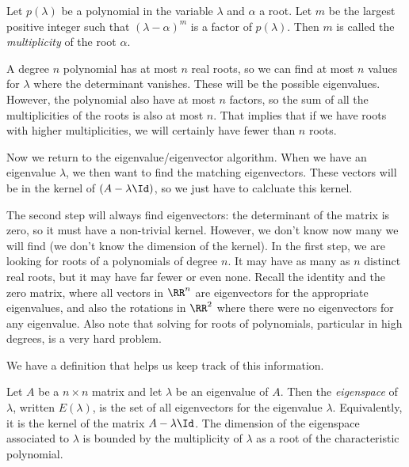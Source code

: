 \documentclass[fleqn]{report}
\begin{document}
\begin{defn}
Let $p(\lambda)$ be a polynomial in the variable $\lambda$ and
$\alpha$ a root. Let $m$ be the largest positive integer such
that $(\lambda - \alpha)^m$ is a factor of $p(\lambda)$. Then
$m$ is called the \emph{multiplicity} of the root $\alpha$. 
\end{defn}

A degree $n$ polynomial has at most $n$ real roots, so we can
find at most $n$ values for $\lambda$ where the determinant
vanishes. These will be the possible eigenvalues. However,
the polynomial also have at most $n$ factors, so the sum of
all the multiplicities of the roots is also at most $n$. That
implies that if we have roots with higher multiplicities, we
will certainly have fewer than $n$ roots. 

Now we return to the eigenvalue/eigenvector algorithm. When
we have an eigenvalue $\lambda$, we then want to find the
matching eigenvectors. These vectors will be in the kernel of
$(A - \lambda \Id)$, so we just have to calcluate this kernel.

The second step will always find eigenvectors: the
determinant of the matrix is zero, so it must have a
non-trivial kernel. However, we don't know now many we will
find (we don't know the dimension of the kernel). In the first
step, we are looking for roots of a polynomials of degree $n$.
It may have as many as $n$ distinct real roots, but it may
have far fewer or even none. Recall the identity and the zero
matrix, where all vectors in $\RR^n$ are eigenvectors for the
appropriate eigenvalues, and also the rotations in $\RR^2$
where there were no eigenvectors for any eigenvalue. Also
note that solving for roots of polynomials, particular in high
degrees, is a very hard problem. 

We have a definition that helps us keep track of this
information.

\begin{defn}
Let $A$ be a $n \times n$ matrix and let $\lambda$ be an
eigenvalue of $A$. Then the \emph{eigenspace} of $\lambda$,
written $E(\lambda)$, is the set of all eigenvectors for the
eigenvalue $\lambda$. Equivalently, it is the kernel of the
matrix $A - \lambda \Id$. The dimension of the eigenspace
associated to $\lambda$ is bounded by the multiplicity of
$\lambda$ as a root of the characteristic polynomial.
\end{defn}
\end{document}
